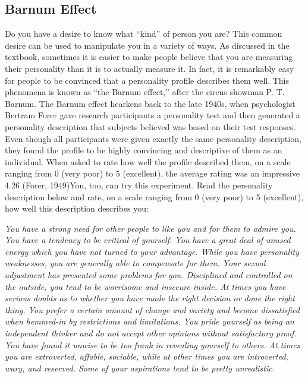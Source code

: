 \documentclass[
]{book}
\begin{document}
\hypertarget{barnum-effect}{%
\subsection*{Barnum Effect}\label{barnum-effect}}

Do you have a desire to know what ``kind'' of person you are? This common desire can be used to manipulate you in a variety of ways. As discussed in the textbook, sometimes it is easier to make people believe that you are measuring their personality than it is to actually measure it. In fact, it is remarkably easy for people to be convinced that a personality profile describes them well. This phenomena is known as ``the Barnum effect,'' after the circus showman P. T. Barnum. The Barnum effect hearkens back to the late 1940s, when psychologist Bertram Forer gave research participants a personality test and then generated a personality description that subjects believed was based on their test responses. Even though all participants were given exactly the same personality description, they found the profile to be highly convincing and descriptive of them as an individual. When asked to rate how well the profile described them, on a scale ranging from 0 (very poor) to 5 (excellent), the average rating was an impressive 4.26 (Forer, 1949)You, too, can try this experiment. Read the personality description below and rate, on a scale ranging from 0 (very poor) to 5 (excellent), how well this description describes you:

\emph{You have a strong need for other people to like you and for them to ad­mire you. You have a tendency to be critical of yourself. You have a great deal of unused energy which you have not turned to your advantage. While you have personality weaknesses, you are generally able to compensate for them. Your sexual adjustment has presented some problems for you. Dis­ci­plined and controlled on the outside, you tend to be worrisome and in­se­cure inside. At times you have serious doubts as to whether you have made the right decision or done the right thing. You prefer a certain amount of change and variety and become dissatisfied when hemmed-in by restrictions and limitations. You pride yourself as being an independent thinker and do not accept other opinions without satisfactory proof. You have found it un­wise to be too frank in revealing yourself to others. At times you are extro­verted, affable, sociable, while at other times you are introverted, wary, and reserved. Some of your aspirations tend to be pretty unrealistic.}
\end{document}
